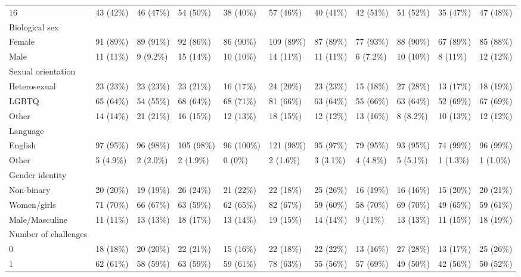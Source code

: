 \begin{table}[ht]
\begin{tabular}{lllllllllll}
  16 & 43 (42\%) & 46 (47\%) & 54 (50\%) & 38 (40\%) & 57 (46\%) & 40 (41\%) & 42 (51\%) & 51 (52\%) & 35 (47\%) & 47 (48\%) \\ 
  Biological sex &  &  &  &  &  &  &  &  &  &  \\ 
  Female & 91 (89\%) & 89 (91\%) & 92 (86\%) & 86 (90\%) & 109 (89\%) & 87 (89\%) & 77 (93\%) & 88 (90\%) & 67 (89\%) & 85 (88\%) \\ 
  Male & 11 (11\%) & 9 (9.2\%) & 15 (14\%) & 10 (10\%) & 14 (11\%) & 11 (11\%) & 6 (7.2\%) & 10 (10\%) & 8 (11\%) & 12 (12\%) \\ 
  Sexual orientation &  &  &  &  &  &  &  &  &  &  \\ 
  Heterosexual & 23 (23\%) & 23 (23\%) & 23 (21\%) & 16 (17\%) & 24 (20\%) & 23 (23\%) & 15 (18\%) & 27 (28\%) & 13 (17\%) & 18 (19\%) \\ 
  LGBTQ & 65 (64\%) & 54 (55\%) & 68 (64\%) & 68 (71\%) & 81 (66\%) & 63 (64\%) & 55 (66\%) & 63 (64\%) & 52 (69\%) & 67 (69\%) \\ 
  Other & 14 (14\%) & 21 (21\%) & 16 (15\%) & 12 (13\%) & 18 (15\%) & 12 (12\%) & 13 (16\%) & 8 (8.2\%) & 10 (13\%) & 12 (12\%) \\ 
  Language &  &  &  &  &  &  &  &  &  &  \\ 
  English & 97 (95\%) & 96 (98\%) & 105 (98\%) & 96 (100\%) & 121 (98\%) & 95 (97\%) & 79 (95\%) & 93 (95\%) & 74 (99\%) & 96 (99\%) \\ 
  Other & 5 (4.9\%) & 2 (2.0\%) & 2 (1.9\%) & 0 (0\%) & 2 (1.6\%) & 3 (3.1\%) & 4 (4.8\%) & 5 (5.1\%) & 1 (1.3\%) & 1 (1.0\%) \\ 
  Gender identity &  &  &  &  &  &  &  &  &  &  \\ 
  Non-binary & 20 (20\%) & 19 (19\%) & 26 (24\%) & 21 (22\%) & 22 (18\%) & 25 (26\%) & 16 (19\%) & 16 (16\%) & 15 (20\%) & 20 (21\%) \\ 
  Women/girls & 71 (70\%) & 66 (67\%) & 63 (59\%) & 62 (65\%) & 82 (67\%) & 59 (60\%) & 58 (70\%) & 69 (70\%) & 49 (65\%) & 59 (61\%) \\ 
  Male/Masculine & 11 (11\%) & 13 (13\%) & 18 (17\%) & 13 (14\%) & 19 (15\%) & 14 (14\%) & 9 (11\%) & 13 (13\%) & 11 (15\%) & 18 (19\%) \\ 
  Number of challenges &  &  &  &  &  &  &  &  &  &  \\ 
  0 & 18 (18\%) & 20 (20\%) & 22 (21\%) & 15 (16\%) & 22 (18\%) & 22 (22\%) & 13 (16\%) & 27 (28\%) & 13 (17\%) & 25 (26\%) \\ 
  1 & 62 (61\%) & 58 (59\%) & 63 (59\%) & 59 (61\%) & 78 (63\%) & 55 (56\%) & 57 (69\%) & 49 (50\%) & 42 (56\%) & 50 (52\%) \\ 

\end{tabular}
\end{table}
